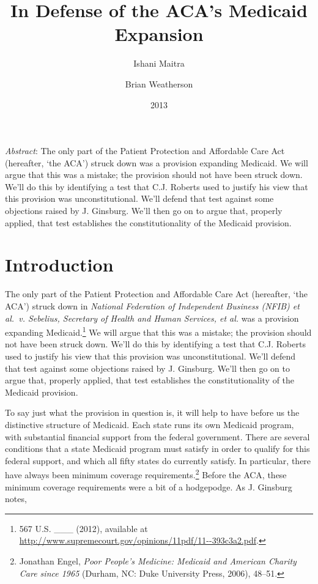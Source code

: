 \documentclass[
  11pt,
  letterpaper,
  DIV=11,
  numbers=noendperiod,
  twoside]{scrartcl}
\title{In Defense of the ACA's Medicaid Expansion}
\author{Ishani Maitra \and Brian Weatherson}
\date{2013}
\renewenvironment{abstract}
 {\vspace{-1.25cm}
 \quotation\small\noindent\emph{Abstract}:}
 {\endquotation}
\renewenvironment{abstract}
 {\quotation\small\noindent\emph{Abstract}:}
 {\endquotation\vspace{-0.02cm}}
\begin{document}
\maketitle
\begin{abstract}
The only part of the Patient Protection and Affordable Care Act
(hereafter, `the ACA') struck down was a provision expanding Medicaid.
We will argue that this was a mistake; the provision should not have
been struck down. We'll do this by identifying a test that C.J. Roberts
used to justify his view that this provision was unconstitutional. We'll
defend that test against some objections raised by J. Ginsburg. We'll
then go on to argue that, properly applied, that test establishes the
constitutionality of the Medicaid provision.
\end{abstract}


\section{Introduction}\label{introduction}

The only part of the Patient Protection and Affordable Care Act
(hereafter, `the ACA') struck down in \emph{National Federation of
Independent Business (NFIB) et al.~v. Sebelius, Secretary of Health and
Human Services, et al.} was a provision expanding Medicaid.\footnote{567
  U.S. \_\_\_ (2012), available at
  \url{http://www.supremecourt.gov/opinions/11pdf/11--393c3a2.pdf}.} We
will argue that this was a mistake; the provision should not have been
struck down. We'll do this by identifying a test that C.J. Roberts used
to justify his view that this provision was unconstitutional. We'll
defend that test against some objections raised by J. Ginsburg. We'll
then go on to argue that, properly applied, that test establishes the
constitutionality of the Medicaid provision.

To say just what the provision in question is, it will help to have
before us the distinctive structure of Medicaid. Each state runs its own
Medicaid program, with substantial financial support from the federal
government. There are several conditions that a state Medicaid program
must satisfy in order to qualify for this federal support, and which all
fifty states do currently satisfy. In particular, there have always been
minimum coverage requirements.\footnote{Jonathan Engel, \emph{Poor
  People's Medicine: Medicaid and American Charity Care since 1965}
  (Durham, NC: Duke University Press, 2006), 48--51.} Before the ACA,
these minimum coverage requirements were a bit of a hodgepodge. As J.
Ginsburg notes,
\end{document}
